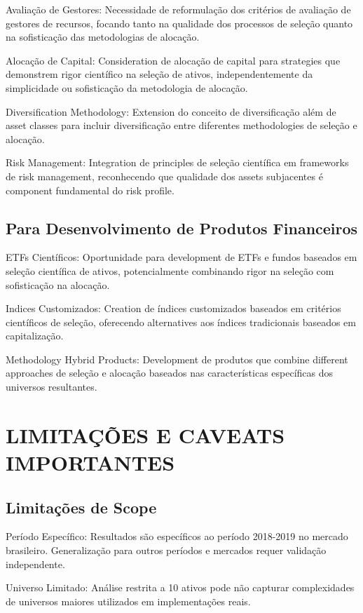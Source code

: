 Avaliação de Gestores: Necessidade de reformulação dos critérios de avaliação de gestores de recursos, focando tanto na qualidade dos processos de seleção quanto na sofisticação das metodologias de alocação.

Alocação de Capital: Consideration de alocação de capital para strategies que demonstrem rigor científico na seleção de ativos, independentemente da simplicidade ou sofisticação da metodologia de alocação.

Diversification Methodology: Extension do conceito de diversificação além de asset classes para incluir diversificação entre diferentes methodologies de seleção e alocação.

Risk Management: Integration de principles de seleção científica em frameworks de risk management, reconhecendo que qualidade dos assets subjacentes é component fundamental do risk profile.

\subsection{Para Desenvolvimento de Produtos Financeiros}

ETFs Científicos: Oportunidade para development de ETFs e fundos baseados em seleção científica de ativos, potencialmente combinando rigor na seleção com sofisticação na alocação.

Indices Customizados: Creation de índices customizados baseados em critérios científicos de seleção, oferecendo alternatives aos índices tradicionais baseados em capitalização.

Methodology Hybrid Products: Development de produtos que combine different approaches de seleção e alocação baseados nas características específicas dos universos resultantes.

\section{LIMITAÇÕES E CAVEATS IMPORTANTES}

\subsection{Limitações de Scope}

Período Específico: Resultados são específicos ao período 2018-2019 no mercado brasileiro. Generalização para outros períodos e mercados requer validação independente.

Universo Limitado: Análise restrita a 10 ativos pode não capturar complexidades de universos maiores utilizados em implementações reais.

